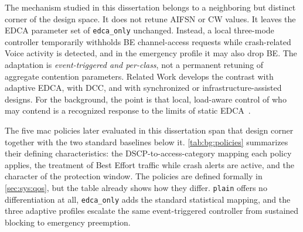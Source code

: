 The mechanism studied in this dissertation belongs to a neighboring but distinct corner of the design space.
It does not retune AIFSN or CW values.
It leaves the EDCA parameter set of \texttt{edca\_only} unchanged.
Instead, a local three-mode controller temporarily withholds BE channel-access requests while crash-related Voice activity is detected, and in the emergency profile it may also drop BE.
The adaptation is \emph{event-triggered and per-class}, not a permanent retuning of aggregate contention parameters.
Related Work develops the contrast with adaptive EDCA, with DCC, and with synchronized or infrastructure-assisted designs.
For the background, the point is that local, load-aware control of who may contend is a recognized response to the limits of static EDCA~\cite{romdhani2003AdaptiveEDCF,Evolution_QoS_Mechanisms}.

The five \gls{mac} policies later evaluated in this dissertation span that design corner together with the two standard baselines below it.
\autoref{tab:bg:policies} summarizes their defining characteristics: the DSCP-to-access-category mapping each policy applies, the treatment of Best Effort traffic while crash alerts are active, and the character of the protection window.
The policies are defined formally in \autoref{sec:sys:qos}, but the table already shows how they differ.
\texttt{plain} offers no differentiation at all, \texttt{edca\_only} adds the standard statistical mapping, and the three adaptive profiles escalate the same event-triggered controller from sustained blocking to emergency preemption.

